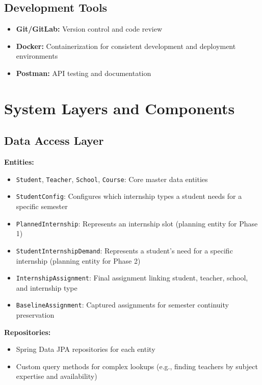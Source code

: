 \documentclass[12pt,a4paper]{report}
\begin{document}
\subsection{Development Tools}

\begin{itemize}
    \item \textbf{Git/GitLab:} Version control and code review
    \item \textbf{Docker:} Containerization for consistent development and deployment environments
    \item \textbf{Postman:} API testing and documentation
\end{itemize}

\section{System Layers and Components}

\subsection{Data Access Layer}

\textbf{Entities:}
\begin{itemize}
    \item \texttt{Student}, \texttt{Teacher}, \texttt{School}, \texttt{Course}: Core master data entities
    \item \texttt{StudentConfig}: Configures which internship types a student needs for a specific semester
    \item \texttt{PlannedInternship}: Represents an internship slot (planning entity for Phase 1)
    \item \texttt{StudentInternshipDemand}: Represents a student's need for a specific internship (planning entity for Phase 2)
    \item \texttt{InternshipAssignment}: Final assignment linking student, teacher, school, and internship type
    \item \texttt{BaselineAssignment}: Captured assignments for semester continuity preservation
\end{itemize}

\textbf{Repositories:}
\begin{itemize}
    \item Spring Data JPA repositories for each entity
    \item Custom query methods for complex lookups (e.g., finding teachers by subject expertise and availability)
\end{itemize}
\end{document}

